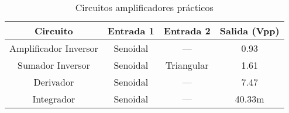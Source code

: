 \begin{table}[H]
  \centering
  \caption{Circuitos amplificadores prácticos}
  \label{tab:amplificadores_practico}
  \begin{tabular}{cccc}
    \toprule
    \textbf{Circuito} & \textbf{Entrada 1} & \textbf{Entrada 2} & \textbf{Salida (Vpp)} \\
    \midrule
    Amplificador Inversor  & Senoidal & ---         & 0.93    \\
    Sumador Inversor       & Senoidal & Triangular & 1.61   \\
    Derivador              & Senoidal & ---         & 7.47 \\
    Integrador             & Senoidal & ---         & 40.33m \\
    \bottomrule
  \end{tabular}
\end{table}